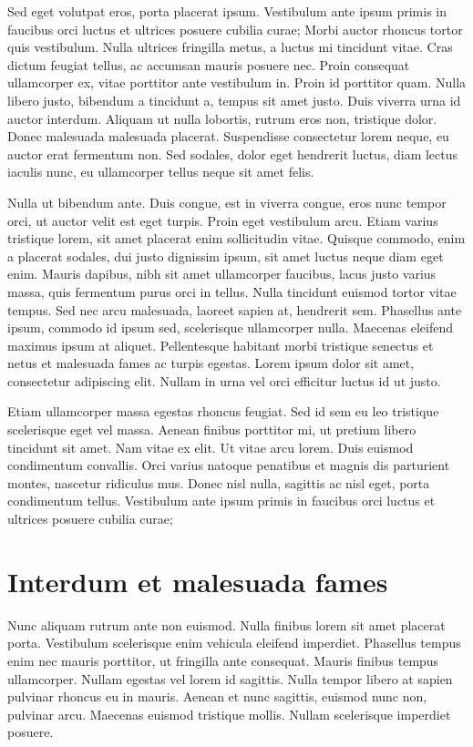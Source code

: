 Sed eget volutpat eros, porta placerat ipsum. Vestibulum ante ipsum primis in faucibus orci luctus et ultrices posuere cubilia curae; Morbi auctor rhoncus tortor quis vestibulum. Nulla ultrices fringilla metus, a luctus mi tincidunt vitae. Cras dictum feugiat tellus, ac accumsan mauris posuere nec. Proin consequat ullamcorper ex, vitae porttitor ante vestibulum in. Proin id porttitor quam. Nulla libero justo, bibendum a tincidunt a, tempus sit amet justo. Duis viverra urna id auctor interdum. Aliquam ut nulla lobortis, rutrum eros non, tristique dolor. Donec malesuada malesuada placerat. Suspendisse consectetur lorem neque, eu auctor erat fermentum non. Sed sodales, dolor eget hendrerit luctus, diam lectus iaculis nunc, eu ullamcorper tellus neque sit amet felis.

Nulla ut bibendum ante. Duis congue, est in viverra congue, eros nunc tempor orci, ut auctor velit est eget turpis. Proin eget vestibulum arcu. Etiam varius tristique lorem, sit amet placerat enim sollicitudin vitae. Quisque commodo, enim a placerat sodales, dui justo dignissim ipsum, sit amet luctus neque diam eget enim. Mauris dapibus, nibh sit amet ullamcorper faucibus, lacus justo varius massa, quis fermentum purus orci in tellus. Nulla tincidunt euismod tortor vitae tempus. Sed nec arcu malesuada, laoreet sapien at, hendrerit sem. Phasellus ante ipsum, commodo id ipsum sed, scelerisque ullamcorper nulla. Maecenas eleifend maximus ipsum at aliquet. Pellentesque habitant morbi tristique senectus et netus et malesuada fames ac turpis egestas. Lorem ipsum dolor sit amet, consectetur adipiscing elit. Nullam in urna vel orci efficitur luctus id ut justo.

Etiam ullamcorper massa egestas rhoncus feugiat. Sed id sem eu leo tristique scelerisque eget vel massa. Aenean finibus porttitor mi, ut pretium libero tincidunt sit amet. Nam vitae ex elit. Ut vitae arcu lorem. Duis euismod condimentum convallis. Orci varius natoque penatibus et magnis dis parturient montes, nascetur ridiculus mus. Donec nisl nulla, sagittis ac nisl eget, porta condimentum tellus. Vestibulum ante ipsum primis in faucibus orci luctus et ultrices posuere cubilia curae;

\section{Interdum et malesuada fames}
Nunc aliquam rutrum ante non euismod. Nulla finibus lorem sit amet placerat porta. Vestibulum scelerisque enim vehicula eleifend imperdiet. Phasellus tempus enim nec mauris porttitor, ut fringilla ante consequat. Mauris finibus tempus ullamcorper. Nullam egestas vel lorem id sagittis. Nulla tempor libero at sapien pulvinar rhoncus eu in mauris. Aenean et nunc sagittis, euismod nunc non, pulvinar arcu. Maecenas euismod tristique mollis. Nullam scelerisque imperdiet posuere.

